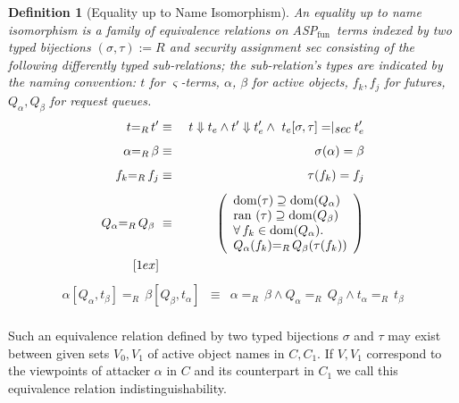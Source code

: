 \documentclass[10pt, conference, compsocconf]{IEEEtran}
\newcommand\aspfun{ASP${}_\text{fun}$\ }
\newcommand{\symb}[1]{\makebox{\it #1}}
\newcommand\dom{{\rm dom}}
\newcommand\ran{{\rm ran}\ }
\newcommand\indR{{=}_{R}\,}
\newcommand\all{\forall\,}
\newtheorem{definition}{Definition}[section]
\begin{document}
{\begin{definition}[Equality up to Name Isomorphism]
\label{def:ind}
An equality up to name isomorphism is a family of equivalence relations on \aspfun terms indexed by two typed bijections $(\sigma, \tau) := R$ and security assignment {\it sec}
consisting of the following differently typed sub-relations; 
the sub-relation's types are indicated by the naming convention: $t$ for $\varsigma$-terms, $\alpha$,
$\beta$ for active objects, $f_k, f_j$ for futures, $Q_\alpha, Q_\beta$ for request queues.
\begin{eqnarray*}
t \indR t' & \equiv & t \Downarrow t_e \wedge t' \Downarrow t'_e \wedge\ t_e[{\sigma,\tau}] =\mid_{\symb{sec}} t'_e \\[1ex]
\alpha \indR \beta & \equiv & \sigma(\alpha) = \beta \\[1ex]
f_k \indR f_j  & \equiv & \tau(f_k) = f_j \\[1ex]
Q_{\alpha} \indR Q_{\beta}\  & \equiv\ &
      \left(\begin{array}{l}
            \dom(\tau) \supseteq \dom(Q_{\alpha}) \\
            \ran(\tau) \supseteq \dom(Q_{\beta}) \\
\all f_k \in \dom(Q_\alpha).\\
            Q_{\alpha}(f_k) \indR Q_{\beta}(\tau(f_k))
      \end{array}\right) \\ [1ex]
\end{eqnarray*}
\vspace{-7ex}
\begin{eqnarray*}
\alpha[Q_{\alpha}, t_{\beta}] \indR \beta[Q_{\beta}, t_{\alpha}] & \equiv & \alpha \indR \beta \wedge Q_{\alpha} \indR Q_{\beta} \wedge t_{\alpha} \indR t_{\beta} \\[1ex]
\end{eqnarray*}
\end{definition}
Such an equivalence relation defined by two typed bijections $\sigma$ and $\tau$ may exist
between given sets $V_0, V_1$ of active object names in $C, C_1$. If $V, V_1$ correspond to the viewpoints
of attacker $\alpha$ in $C$ and its counterpart in $C_1$ we call this equivalence relation 
indistinguishability.


}
\end{document}
